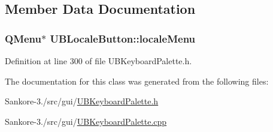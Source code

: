\subsection{Member Data Documentation}
\hypertarget{class_u_b_locale_button_a36aa8f803e96076e132307ba7e1e5c3e}{
\subsubsection[{locale\-Menu}]{\setlength{\rightskip}{0pt plus 5cm}Q\-Menu$\ast$ U\-B\-Locale\-Button\-::locale\-Menu\hspace{0.3cm}{\ttfamily [protected]}}}\label{de/d9c/class_u_b_locale_button_a36aa8f803e96076e132307ba7e1e5c3e}


Definition at line 300 of file U\-B\-Keyboard\-Palette.\-h.



The documentation for this class was generated from the following files\-:\begin{DoxyCompactItemize}
\item 
Sankore-\/3./src/gui/\hyperlink{_u_b_keyboard_palette_8h}{U\-B\-Keyboard\-Palette.\-h}\item 
Sankore-\/3./src/gui/\hyperlink{_u_b_keyboard_palette_8cpp}{U\-B\-Keyboard\-Palette.\-cpp}\end{DoxyCompactItemize}
